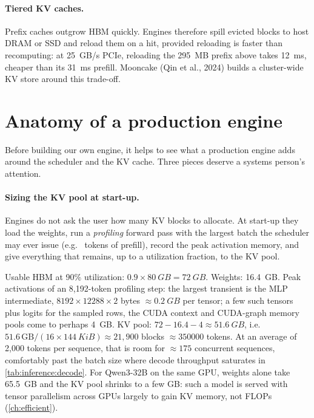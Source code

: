 \paragraph{Tiered KV caches.} Prefix caches outgrow HBM quickly. Engines therefore spill evicted blocks
to host DRAM or SSD and reload them on a hit, provided reloading is faster than recomputing:
at \SI{25}{GB/s} PCIe, reloading the \SI{295}{MB} prefix above takes \SI{12}{ms}, cheaper than its
\SI{31}{ms} prefill. Mooncake (Qin et al., 2024) builds a cluster-wide KV store around this trade-off.

\section{Anatomy of a production engine}\label{sec:serving:anatomy}

Before building our own engine, it helps to see what a production engine adds around the scheduler
and the KV cache. Three pieces deserve a systems person's attention.

\paragraph{Sizing the KV pool at start-up.} Engines do not ask the user how many KV blocks to
allocate. At start-up they load the weights, run a \emph{profiling} forward pass with the largest
batch the scheduler may ever issue (e.g.\  tokens of prefill), record the
peak activation memory, and give everything that remains, up to a utilization fraction, to the KV pool.

\begin{napkinmath}
Usable HBM at 90\% utilization: $0.9\times\SI{80}{GB}=\SI{72}{GB}$. Weights: \SI{16.4}{GB}. Peak activations of an
8,192-token profiling step: the largest transient is the MLP intermediate, $8192\times12288\times2$ bytes
$\approx\SI{0.2}{GB}$ per tensor; a few such tensors plus logits for the sampled rows, the CUDA context
and CUDA-graph memory pools come to perhaps \SI{4}{GB}. KV pool:
$72-16.4-4\approx\SI{51.6}{GB}$, i.e.\ $51.6\,\text{GB}/(16\times\SI{144}{KiB})\approx21{,}900$ blocks
$\approx\num{350000}$ tokens. At an average of 2,000 tokens per sequence, that is room for $\approx175$
concurrent sequences, comfortably past the batch size where decode throughput saturates in
\cref{tab:inference:decode}. For Qwen3-32B on the same GPU, weights alone take \SI{65.5}{GB} and the KV
pool shrinks to a few GB: such a model is served with tensor parallelism across GPUs largely to gain
KV memory, not FLOPs (\cref{ch:efficient}).
\end{napkinmath}

